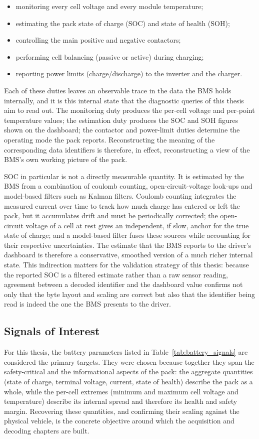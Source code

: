 \documentclass[11pt,a4paper,oneside,parskip=half]{scrreprt}
\begin{document}
\begin{itemize}
  \item monitoring every cell voltage and every module temperature;
  \item estimating the pack state of charge (SOC) and state of health (SOH);
  \item controlling the main positive and negative contactors;
  \item performing cell balancing (passive or active) during charging;
  \item reporting power limits (charge/discharge) to the inverter and the charger.
\end{itemize}

Each of these duties leaves an observable trace in the data the BMS holds internally, and it is this internal state that the diagnostic queries of this thesis aim to read out. The monitoring duty produces the per-cell voltage and per-point temperature values; the estimation duty produces the SOC and SOH figures shown on the dashboard; the contactor and power-limit duties determine the operating mode the pack reports. Reconstructing the meaning of the corresponding data identifiers is therefore, in effect, reconstructing a view of the BMS's own working picture of the pack.

SOC in particular is not a directly measurable quantity. It is estimated by the BMS from a combination of coulomb counting, open-circuit-voltage look-ups and model-based filters such as Kalman filters. Coulomb counting integrates the measured current over time to track how much charge has entered or left the pack, but it accumulates drift and must be periodically corrected; the open-circuit voltage of a cell at rest gives an independent, if slow, anchor for the true state of charge; and a model-based filter fuses these sources while accounting for their respective uncertainties. The estimate that the BMS reports to the driver's dashboard is therefore a conservative, smoothed version of a much richer internal state. This indirection matters for the validation strategy of this thesis: because the reported SOC is a filtered estimate rather than a raw sensor reading, agreement between a decoded identifier and the dashboard value confirms not only that the byte layout and scaling are correct but also that the identifier being read is indeed the one the BMS presents to the driver.

\subsection{Signals of Interest}
For this thesis, the battery parameters listed in Table~\ref{tab:battery_signals} are considered the primary targets. They were chosen because together they span the safety-critical and the informational aspects of the pack: the aggregate quantities (state of charge, terminal voltage, current, state of health) describe the pack as a whole, while the per-cell extremes (minimum and maximum cell voltage and temperature) describe its internal spread and therefore its health and safety margin. Recovering these quantities, and confirming their scaling against the physical vehicle, is the concrete objective around which the acquisition and decoding chapters are built.
\end{document}
